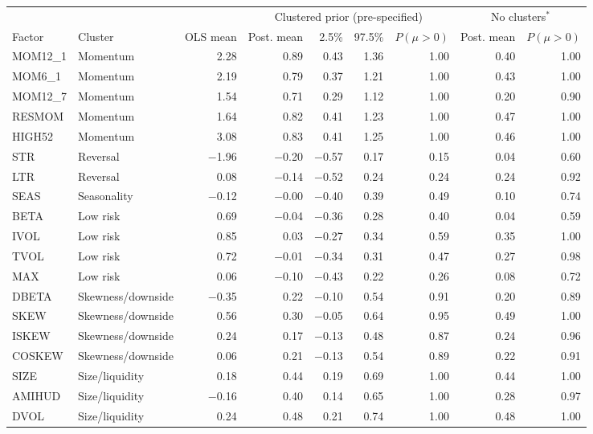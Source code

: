 \begin{tabular}{ll r rrr r rr}
\toprule
 & & & \multicolumn{4}{c}{Clustered prior (pre-specified)} & \multicolumn{2}{c}{No clusters$^\ast$} \\
\cmidrule(lr){4-7}\cmidrule(lr){8-9}
Factor & Cluster & OLS mean & Post. mean & 2.5\% & 97.5\% & $P(\mu>0)$ & Post. mean & $P(\mu>0)$ \\
\midrule
MOM12\_1 & Momentum & 2.28 & 0.89 & 0.43 & 1.36 & 1.00 & 0.40 & 1.00 \\
MOM6\_1 & Momentum & 2.19 & 0.79 & 0.37 & 1.21 & 1.00 & 0.43 & 1.00 \\
MOM12\_7 & Momentum & 1.54 & 0.71 & 0.29 & 1.12 & 1.00 & 0.20 & 0.90 \\
RESMOM & Momentum & 1.64 & 0.82 & 0.41 & 1.23 & 1.00 & 0.47 & 1.00 \\
HIGH52 & Momentum & 3.08 & 0.83 & 0.41 & 1.25 & 1.00 & 0.46 & 1.00 \\
\addlinespace[2pt]
STR & Reversal & $-$1.96 & $-$0.20 & $-$0.57 & 0.17 & 0.15 & 0.04 & 0.60 \\
LTR & Reversal & 0.08 & $-$0.14 & $-$0.52 & 0.24 & 0.24 & 0.24 & 0.92 \\
\addlinespace[2pt]
SEAS & Seasonality & $-$0.12 & $-$0.00 & $-$0.40 & 0.39 & 0.49 & 0.10 & 0.74 \\
\addlinespace[2pt]
BETA & Low risk & 0.69 & $-$0.04 & $-$0.36 & 0.28 & 0.40 & 0.04 & 0.59 \\
IVOL & Low risk & 0.85 & 0.03 & $-$0.27 & 0.34 & 0.59 & 0.35 & 1.00 \\
TVOL & Low risk & 0.72 & $-$0.01 & $-$0.34 & 0.31 & 0.47 & 0.27 & 0.98 \\
MAX & Low risk & 0.06 & $-$0.10 & $-$0.43 & 0.22 & 0.26 & 0.08 & 0.72 \\
\addlinespace[2pt]
DBETA & Skewness/downside & $-$0.35 & 0.22 & $-$0.10 & 0.54 & 0.91 & 0.20 & 0.89 \\
SKEW & Skewness/downside & 0.56 & 0.30 & $-$0.05 & 0.64 & 0.95 & 0.49 & 1.00 \\
ISKEW & Skewness/downside & 0.24 & 0.17 & $-$0.13 & 0.48 & 0.87 & 0.24 & 0.96 \\
COSKEW & Skewness/downside & 0.06 & 0.21 & $-$0.13 & 0.54 & 0.89 & 0.22 & 0.91 \\
\addlinespace[2pt]
SIZE & Size/liquidity & 0.18 & 0.44 & 0.19 & 0.69 & 1.00 & 0.44 & 1.00 \\
AMIHUD & Size/liquidity & $-$0.16 & 0.40 & 0.14 & 0.65 & 1.00 & 0.28 & 0.97 \\
DVOL & Size/liquidity & 0.24 & 0.48 & 0.21 & 0.74 & 1.00 & 0.48 & 1.00 \\

\end{tabular}
